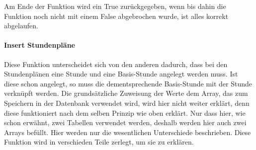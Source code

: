 \begin{enumerate}


\end{enumerate}
Am Ende der Funktion wird ein True zurückgegeben, wenn bis dahin die Funktion noch nicht mit einem False abgebrochen wurde, ist alles korrekt abgelaufen.

\paragraph{Insert Stundenpläne\\}
Diese Funktion unterscheidet sich von den anderen dadurch, dass bei den Stundenplänen eine Stunde und eine Basis-Stunde angelegt werden muss. Ist diese schon angelegt, so muss die dementsprechende Basis-Stunde mit der Stunde verknüpft werden. Die grundsätzliche Zuweisung der Werte dem Array, das zum Speichern in der Datenbank verwendet wird, wird hier nicht weiter erklärt, denn diese funktioniert nach dem selben Prinzip wie oben erklärt. Nur dass hier, wie schon erwähnt, zwei Tabellen verwendet werden, deshalb werden hier auch zwei Arrays befüllt. Hier werden nur die wesentlichen Unterschiede beschrieben. Diese Funktion wird in verschieden Teile zerlegt, um sie zu erklären.\\
